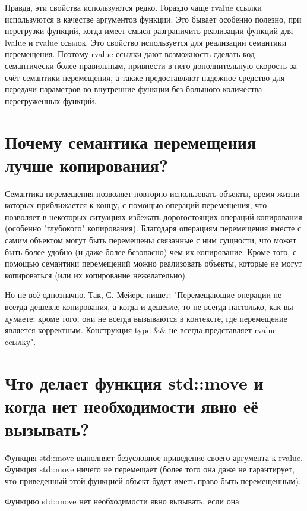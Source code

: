 \documentclass[a4paper,12pt]{article}	%
\begin{document}
	Правда, эти свойства используются редко. Гораздо чаще rvalue ссылки используются в качестве аргументов функции. Это бывает особенно полезно, при перегрузки функций, когда имеет смысл разграничить реализации функций для lvalue и rvalue ссылок. Это свойство используется для реализации семантики перемещения. Поэтому rvalue ссылки дают возможность сделать код семантически более правильным, привнести в него дополнительную скорость за счёт семантики перемещения, а также предоставляют надежное средство для передачи параметров во внутренние функции без большого количества перегруженных функций.

\newpage

\section{Почему семантика перемещения лучше копирования?}

	 Семантика перемещения позволяет повторно использовать объекты, время жизни которых приближается к концу, с помощью операций перемещения, что позволяет в некоторых ситуациях избежать дорогостоящих операций копирования (особенно "глубокого" копирования).  Благодаря операциям перемещения вместе с самим объектом могут быть перемещены связанные с ним сущности, что может быть более удобно (и даже более безопасно) чем их копирование. Кроме того, с помощью семантики перемещений можно реализовать объекты, которые не могут копироваться (или их копирование нежелательно).

	Но не всё однозначно. Так, С. Мейерс пишет: "Перемещающие операции не всеrда дешевле копирования, а когда и дешевле, то не всегда настолько, как вы думаете; кроме того, они не всегда вызываются в контексте, где перемещение является корректным. Конструкция type \&\& не всегда представляет rvalue-ccылкy".	 

\newpage

\section{Что делает функция std::move и когда нет необходимости явно её вызывать?}

	Функция std::move выполняет безусловное приведение своего аргумента к rvalue. Функция std::move ничего не перемещает (более того она даже не
гарантирует, что приведенный этой функцией объект будет иметь право быть перемещенным).
	
	Функцию std::move нет необходимости явно вызывать, если она:
	
\end{document}
